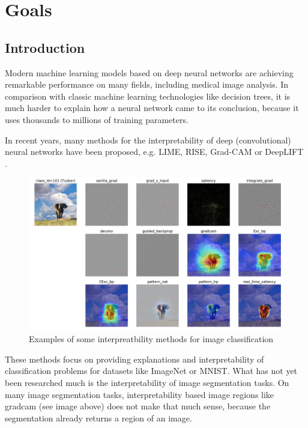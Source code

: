 \chapter{Goals}

\section{Introduction}
Modern machine learning models based on deep neural networks are achieving remarkable performance on many fields, including medical image analysis. In comparison
with classic machine learning technologies like decision trees, it is much harder to explain how a neural network came to its conclusion, because it uses thousands to millions of training parameters.

In recent years, many methods for the interpretability of deep (convolutional) neural networks have been proposed, e.g. LIME\cite{ribeiro2016should}, RISE\cite{Petsiuk2018rise}, Grad-CAM\cite{selvaraju2017grad} or DeepLIFT \cite{shrikumar2017learning}.

\begin{figure}[h]
\centering
\caption{Examples of some interpreatbility methods for image classification \cite{visualattribution}}
\includegraphics[width=14cm]{images/tusker_saliency.png}
\end{figure}

These methods focus on providing explanations and interpretability of classification problems for datasets like ImageNet or MNIST. What has not yet been researched much is the interpretability of image segmentation tasks. On many image segmentation tasks, interpretability based image regions like gradcam (see image above) does not make that much sense, because the segmentation already returns a region of an image.

